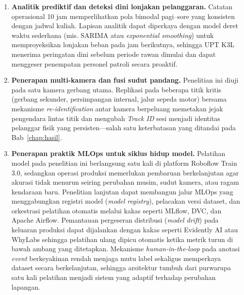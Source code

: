 \begin{enumerate}[1.]
  \item \textbf{Analitik prediktif dan deteksi dini lonjakan pelanggaran.}
    Catatan operasional 10 jam memperlihatkan pola bimodal pagi--sore yang konsisten dengan jadwal kuliah. Lapisan analitik dapat diperkaya dengan model deret waktu sederhana (mis. SARIMA atau \textit{exponential smoothing}) untuk memproyeksikan lonjakan beban pada jam berikutnya, sehingga UPT K3L menerima peringatan dini sebelum periode rawan dimulai dan dapat menggeser penempatan personel patroli secara proaktif.

  \item \textbf{Penerapan multi-kamera dan fusi sudut pandang.}
    Penelitian ini diuji pada satu kamera gerbang utama. Replikasi pada beberapa titik kritis (gerbang sekunder, persimpangan internal, jalur sepeda motor) bersama mekanisme \textit{re-identification} antar kamera berpeluang memetakan jejak pengendara lintas titik dan mengubah \textit{Track ID} sesi menjadi identitas pelanggar fisik yang persisten---salah satu keterbatasan yang ditandai pada Bab~\ref{chap:hasil}.

  \item \textbf{Penerapan praktik MLOps untuk siklus hidup model.}
    Pelatihan model pada penelitian ini berlangsung satu kali di platform Roboflow Train 3.0, sedangkan operasi produksi memerlukan pembaruan berkelanjutan agar akurasi tidak menurun seiring perubahan musim, sudut kamera, atau ragam kendaraan baru. Penelitian lanjutan dapat membangun jalur MLOps yang menggabungkan registri model (\textit{model registry}), pelacakan versi dataset, dan orkestrasi pelatihan otomatis melalui kakas seperti MLflow, DVC, dan Apache Airflow. Pemantauan pergeseran distribusi (\textit{model drift}) pada keluaran produksi dapat dijalankan dengan kakas seperti Evidently AI atau WhyLabs sehingga pelatihan ulang dipicu otomatis ketika metrik turun di bawah ambang yang ditetapkan. Mekanisme \textit{human-in-the-loop} pada anotasi \textit{event} berkeyakinan rendah menjaga mutu label sekaligus memperkaya dataset secara berkelanjutan, sehingga arsitektur tumbuh dari purwarupa satu kali pelatihan menjadi sistem yang adaptif terhadap perubahan lapangan.


\end{enumerate}
